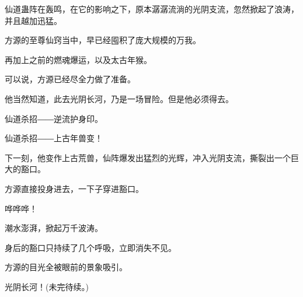 \begin{this_body}
仙道蛊阵在轰鸣，在它的影响之下，原本潺潺流淌的光阴支流，忽然掀起了浪涛，并且越加迅猛。

方源的至尊仙窍当中，早已经囤积了庞大规模的万我。

再加上之前的燃魂爆运，以及太古年猴。

可以说，方源已经尽全力做了准备。

他当然知道，此去光阴长河，乃是一场冒险。但是他必须得去。

仙道杀招――逆流护身印。

仙道杀招――上古年兽变！

下一刻，他变作上古荒兽，仙阵爆发出猛烈的光辉，冲入光阴支流，撕裂出一个巨大的豁口。

方源直接投身进去，一下子穿进豁口。

哗哗哗！

潮水澎湃，掀起万千波涛。

身后的豁口只持续了几个呼吸，立即消失不见。

方源的目光全被眼前的景象吸引。

光阴长河！(未完待续。)

\end{this_body}

